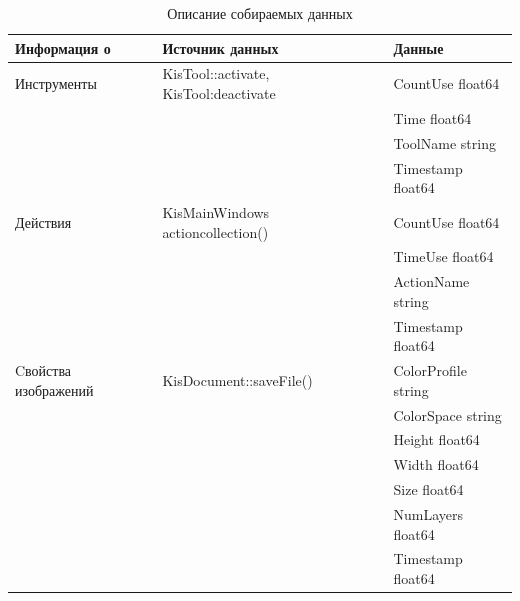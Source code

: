 \begin{table}[h]

\caption{\label{tab:collectdata}Описание собираемых данных}

\begin{center}

\begin{tabular}{|l|l|l|}

\hline

Информация о & Источник данных & Данные \\

\hline \hline

Инструменты & KisTool::activate, KisTool:deactivate & 

CountUse float64 

\tabularnewline & & Time     float64 

\tabularnewline & & ToolName string 

\tabularnewline & & Timestamp     float64 \\


\hline

Действия & 

KisMainWindows actioncollection()

& 

CountUse float64 

\tabularnewline & & TimeUse      float64 

\tabularnewline & & ActionName string 

\tabularnewline & & Timestamp     float64 \\


\hline

Cвойства изображений & 

KisDocument::saveFile()

& 

ColorProfile string 

\tabularnewline & &  ColorSpace   string 

\tabularnewline & & Height       float64 

\tabularnewline & & Width      float64

\tabularnewline & & Size      float64 

\tabularnewline & & NumLayers      float64 

\tabularnewline & & Timestamp     float64 \\


\hline


\end{tabular}

\end{center}

\end{table}
